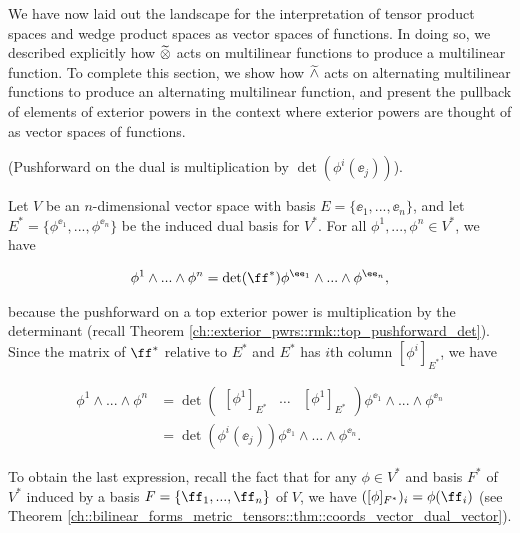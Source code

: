 
We have now laid out the landscape for the interpretation of tensor product spaces and wedge product spaces as vector spaces of functions. In doing so, we described explicitly how $\widetilde{\otimes}$ acts on multilinear functions to produce a multilinear function. To complete this section, we show how $\widetilde{\wedge}$ acts on alternating multilinear functions to produce an alternating multilinear function, and present the pullback of elements of exterior powers in the context where exterior powers are thought of as vector spaces of functions.

\begin{lemma}
\label{ch::exterior_pwrs::lemma::pushforward_on_dual}

    (Pushforward on the dual is multiplication by $\det(\phi^i(\ee_j))$).
    
    Let $V$ be an $n$-dimensional vector space with basis $E = \{\ee_1, ..., \ee_n\}$, and let $E^* = \{\phi^{\ee_1}, ..., \phi^{\ee_n}\}$ be the induced dual basis for $V^*$. For all $\phi^1, ..., \phi^n \in V^*$, we have
    
    \begin{align*}
        \phi^1 \wedge ... \wedge \phi^n = \det(\ff^*) \phi^{\ee_1} \wedge ... \wedge \phi^{\ee_n},
    \end{align*}
    
    because the pushforward on a top exterior power is multiplication by the determinant (recall Theorem \ref{ch::exterior_pwrs::rmk::top_pushforward_det}). Since the matrix of $\ff^*$ relative to $E^*$ and $E^*$ has $i$th column $[\phi^i]_{E^*}$, we have
    
    \begin{align*}
        \phi^1 \wedge ... \wedge \phi^n &= \det \begin{pmatrix} [\phi^1]_{E^*} & \hdots & [\phi^1]_{E^*} \end{pmatrix} \phi^{\ee_1} \wedge ... \wedge \phi^{\ee_n} \\
        &= \det(\phi^i(\ee_j)) \phi^{\ee_1} \wedge ... \wedge \phi^{\ee_n}.
    \end{align*}
    
    To obtain the last expression, recall the fact that for any $\phi \in V^*$ and basis $F^*$ of $V^*$ induced by a basis $F = \{\ff_1, ..., \ff_n\}$ of $V$, we have $([\phi]_{F^*})_i = \phi(\ff_i)$ (see Theorem \ref{ch::bilinear_forms_metric_tensors::thm::coords_vector_dual_vector}).
\end{lemma}

